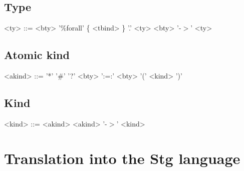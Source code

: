 \subsection*{Type}

\begin{grammar}
<ty> ::= <bty>
    \alt '\%forall' \{ <tbind> \} '.' <ty>
    \alt <bty> '-$>$' <ty>
\end{grammar}

\subsection*{Atomic kind}

\begin{grammar}
<akind> ::= '*'
       \alt '\#'
       \alt '?'
       \alt <bty> ':=:' <bty>
       \alt '(' <kind> ')'
\end{grammar}

\subsection*{Kind}

\begin{grammar}
<kind> ::= <akind>
      \alt <akind> '-$>$' <kind>
\end{grammar}

\section*{Translation into the Stg language}


